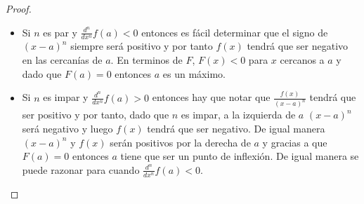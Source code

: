 \documentclass[12pt,a4paper,oneside]{memoir}
\begin{document}
\begin{proof}
\begin{itemize}
        \item Si $n$ es par y $\frac{d^n}{dx^n} f(a) < 0$ entonces es fácil determinar que el signo de $(x-a)^n$ siempre será positivo y por tanto $f(x)$ tendrá que ser negativo en las cercanías de $a$. En terminos de $F$, $F(x) < 0$ para $x$ cercanos a $a$ y dado que $F(a) = 0$ entonces $a$ es un máximo.
        \item Si $n$ es impar y $\frac{d^n}{dx^n} f(a) > 0$ entonces hay que notar que $ \frac{f(x)}{(x-a)^n}$ tendrá que ser positivo y por tanto, dado que $n$ es impar, a la izquierda de $a$ $(x-a)^n$ será negativo y luego $f(x)$ tendrá que ser negativo. De igual manera $(x-a)^n$ y $f(x)$ serán positivos por la derecha de $a$ y gracias a que $F(a) = 0$ entonces $a$ tiene que ser un punto de inflexión. De igual manera se puede razonar para cuando $\frac{d^n}{dx^n} f(a) < 0$.
    \end{itemize}
\end{proof}
\end{document}
